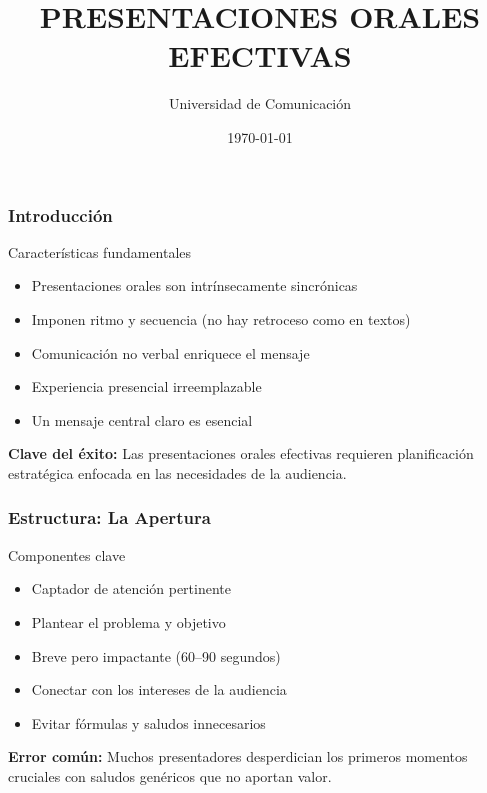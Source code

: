 \documentclass{beamer}
\title[PRESENTACIONES EFECTIVAS]{\textbf{PRESENTACIONES ORALES EFECTIVAS}}
\author{Universidad de Comunicación}
\date{\today}
\begin{document}
	
	\begin{frame}[plain]
		\titlepage
	\end{frame}
	
	\begin{frame}
		\frametitle{Introducción}
		
		\begin{block}{Características fundamentales}
			\begin{itemize}
				\item Presentaciones orales son intrínsecamente sincrónicas
				\item Imponen ritmo y secuencia (no hay retroceso como en textos)
				\item Comunicación no verbal enriquece el mensaje
				\item Experiencia presencial irreemplazable
				\item Un mensaje central claro es esencial
			\end{itemize}
		\end{block}
		
		\vspace{0.5em}
		
		\alert{\textbf{Clave del éxito:}} Las presentaciones orales efectivas requieren planificación estratégica enfocada en las necesidades de la audiencia.
	\end{frame}
	
	\begin{frame}
		\frametitle{Estructura: La Apertura}
		
		\begin{block}{Componentes clave}
			\begin{itemize}
				\item Captador de atención pertinente
				\item Plantear el problema y objetivo
				\item Breve pero impactante (60–90 segundos)
				\item Conectar con los intereses de la audiencia
				\item Evitar fórmulas y saludos innecesarios
			\end{itemize}
		\end{block}
		
		\vspace{0.5em}
		\alert{\textbf{Error común:}} Muchos presentadores desperdician los primeros momentos cruciales con saludos genéricos que no aportan valor.
	\end{frame}
	
\end{document}
